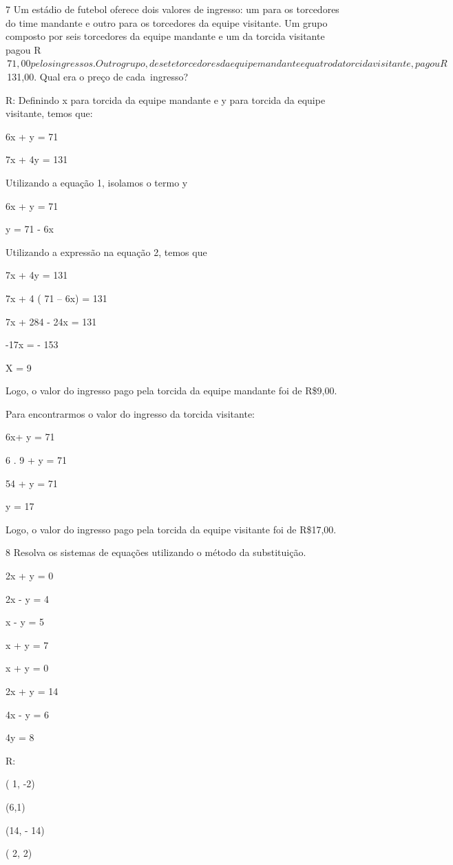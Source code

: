 {\num{7} Um estádio de futebol oferece dois valores de ingresso: um para os
torcedores do time mandante e outro para os torcedores da equipe visitante. Um
grupo composto por seis torcedores da equipe mandante e um da torcida
visitante pagou R$\,71,00 pelos ingressos. Outro grupo, de sete torcedores da
equipe mandante e quatro da torcida visitante, pagou R$\,131,00. Qual era o
preço de cada~ingresso?

R: Definindo x para torcida da equipe mandante e y para torcida da equipe
visitante, temos que:

6x + y = 71

7x + 4y = 131

Utilizando a equação 1, isolamos o termo y

6x + y = 71

y = 71 - 6x

Utilizando a expressão na equação 2, temos que

7x + 4y = 131

7x + 4 ( 71 -- 6x) = 131

7x + 284 - 24x = 131

-17x = - 153

X = 9

Logo, o valor do ingresso pago pela torcida da equipe mandante foi de
R\$9,00.

Para encontrarmos o valor do ingresso da torcida visitante:

6x+ y = 71

6 . 9 + y = 71

54 + y = 71

y = 17

Logo, o valor do ingresso pago pela torcida da equipe visitante foi de
R\$17,00.

\num{8} Resolva os sistemas de equações utilizando o método da substituição.
\item 2x + y = 0

2x - y = 4
\item x - y = 5

x + y = 7
\item x + y = 0

2x + y = 14
\item 4x - y = 6

4y = 8

R:
\item ( 1, -2)
\item (6,1)
\item (14, - 14)
\item ( 2, 2)

}
